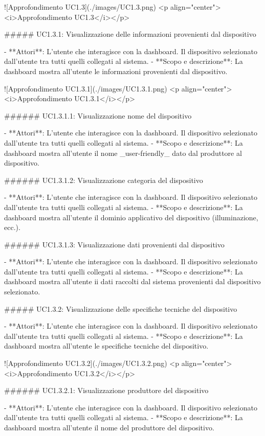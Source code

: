 ![Approfondimento UC1.3](./images/UC1.3.png)
<p align="center"><i>Approfondimento UC1.3</i></p>

##### UC1.3.1: Visualizzazione delle informazioni provenienti dal dispositivo

-   **Attori**:  
    L'utente che interagisce con la dashboard. Il dispositivo selezionato dall'utente tra tutti quelli collegati al sistema.
-   **Scopo e descrizione**:  
    La dashboard mostra all'utente le informazioni provenienti dal dispositivo.

![Approfondimento UC1.3.1](./images/UC1.3.1.png)
<p align="center"><i>Approfondimento UC1.3.1</i></p>


###### UC1.3.1.1: Visualizzazione nome del dispositivo

-   **Attori**:  
    L'utente che interagisce con la dashboard. Il dispositivo selezionato dall'utente tra tutti quelli collegati al sistema.
-   **Scopo e descrizione**:  
    La dashboard mostra all'utente il nome _user-friendly_ dato dal produttore al dispositivo.


###### UC1.3.1.2: Visualizzazione categoria del dispositivo

-   **Attori**:  
    L'utente che interagisce con la dashboard. Il dispositivo selezionato dall'utente tra tutti quelli collegati al sistema.
-   **Scopo e descrizione**:  
    La dashboard mostra all'utente il dominio applicativo del dispositivo (illuminazione, ecc.).

###### UC1.3.1.3: Visualizzazione dati provenienti dal dispositivo

-   **Attori**:  
    L'utente che interagisce con la dashboard. Il dispositivo selezionato dall'utente tra tutti quelli collegati al sistema.
-   **Scopo e descrizione**:  
    La dashboard mostra all'utente ii dati raccolti dal sistema provenienti dal dispositivo selezionato.


##### UC1.3.2: Visualizzazione delle specifiche tecniche del dispositivo

-   **Attori**:  
    L'utente che interagisce con la dashboard. Il dispositivo selezionato dall'utente tra tutti quelli collegati al sistema.
-   **Scopo e descrizione**:  
    La dashboard mostra all'utente le specifiche tecniche del dispositivo.

![Approfondimento UC1.3.2](./images/UC1.3.2.png)
<p align="center"><i>Approfondimento UC1.3.2</i></p>


###### UC1.3.2.1: Visualizzazione produttore del dispositivo

-   **Attori**:  
    L'utente che interagisce con la dashboard. Il dispositivo selezionato dall'utente tra tutti quelli collegati al sistema.
-   **Scopo e descrizione**:  
    La dashboard mostra all'utente il nome del produttore del dispositivo.


